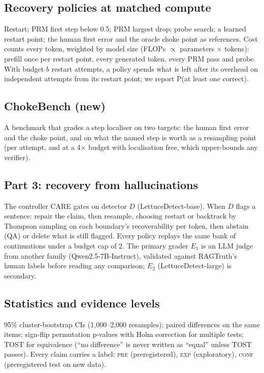 \documentclass[11pt,a4paper]{article}
\begin{document}
\subsection{Recovery policies at matched compute}
Restart; PRM first step below 0.5; PRM largest drop; probe search; a learned restart point; the
human first error and the oracle choke point as references. Cost counts every token, weighted by
model size (FLOPs $\propto$ parameters $\times$ tokens): prefill once per restart point, every
generated token, every PRM pass and probe. With budget $b$ restart attempts, a policy spends what
is left after its overhead on independent attempts from its restart point; we report P(at least one
correct).

\subsection{ChokeBench (new)}
A benchmark that grades a step localiser on two targets: the human first error and the choke point,
and on what the named step is worth as a resampling point (per attempt, and at a 4$\times$ budget with
localisation free, which upper-bounds any verifier).

\subsection{Part 3: recovery from hallucinations}
The controller CARE gates on detector $D$ (LettuceDetect-base). When $D$ flags a sentence: repair
the claim, then resample, choosing restart or backtrack by Thompson sampling on each boundary's
recoverability per token, then abstain (QA) or delete what is still flagged. Every policy replays the
same bank of continuations under a budget cap of 2. The primary grader $E_1$ is an LLM judge from
another family (Qwen2.5-7B-Instruct), validated against RAGTruth's human labels before reading any
comparison; $E_2$ (LettuceDetect-large) is secondary.

\subsection{Statistics and evidence levels}
95\% cluster-bootstrap CIs (1,000--2,000 resamples); paired differences on the same items;
sign-flip permutation p-values with Holm correction for multiple tests; TOST for equivalence
(``no difference'' is never written as ``equal'' unless TOST passes). Every claim carries a label:
\textsc{pre} (preregistered), \textsc{exp} (exploratory), \textsc{conf} (preregistered test on new data).
\end{document}
